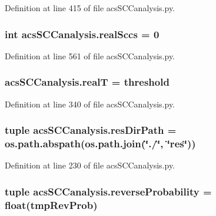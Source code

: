 Definition at line 415 of file acs\+S\+C\+Canalysis.\+py.

\hypertarget{a00130_ac6aaa0ac5d13b0736ab3179dc1ed388d}{
\subsubsection[{real\+Sccs}]{\setlength{\rightskip}{0pt plus 5cm}int acs\+S\+C\+Canalysis.\+real\+Sccs = 0}}\label{a00130_ac6aaa0ac5d13b0736ab3179dc1ed388d}


Definition at line 561 of file acs\+S\+C\+Canalysis.\+py.

\hypertarget{a00130_a1c9b45f6074222ace96b7ab38cb8e23b}{
\subsubsection[{real\+T}]{\setlength{\rightskip}{0pt plus 5cm}acs\+S\+C\+Canalysis.\+real\+T = {\bf threshold}}}\label{a00130_a1c9b45f6074222ace96b7ab38cb8e23b}


Definition at line 340 of file acs\+S\+C\+Canalysis.\+py.

\hypertarget{a00130_a9ededb3cd7c63befde39ad68e5f9e006}{
\subsubsection[{res\+Dir\+Path}]{\setlength{\rightskip}{0pt plus 5cm}tuple acs\+S\+C\+Canalysis.\+res\+Dir\+Path = os.\+path.\+abspath(os.\+path.\+join(\char`\"{}./\char`\"{}, \char`\"{}res\char`\"{}))}}\label{a00130_a9ededb3cd7c63befde39ad68e5f9e006}


Definition at line 230 of file acs\+S\+C\+Canalysis.\+py.

\hypertarget{a00130_aa7db2dba66810044f9c5238eccc995b7}{
\subsubsection[{reverse\+Probability}]{\setlength{\rightskip}{0pt plus 5cm}tuple acs\+S\+C\+Canalysis.\+reverse\+Probability = float(tmp\+Rev\+Prob)}}\label{a00130_aa7db2dba66810044f9c5238eccc995b7}


